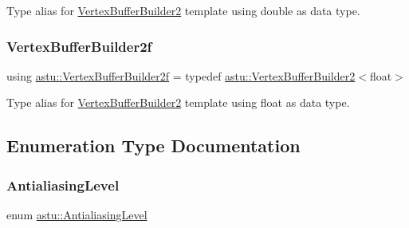 Type alias for \hyperlink{classastu_1_1VertexBufferBuilder2}{Vertex\+Buffer\+Builder2} template using double as data type. \mbox{\label{group__gfx__group_ga45033e159deced790d4dc3968ad8e878}} 
\subsubsection{\texorpdfstring{Vertex\+Buffer\+Builder2f}{VertexBufferBuilder2f}}
{\footnotesize\ttfamily using \hyperlink{group__gfx__group_ga45033e159deced790d4dc3968ad8e878}{astu\+::\+Vertex\+Buffer\+Builder2f} = typedef \hyperlink{classastu_1_1VertexBufferBuilder2}{astu\+::\+Vertex\+Buffer\+Builder2}$<$float$>$}

Type alias for \hyperlink{classastu_1_1VertexBufferBuilder2}{Vertex\+Buffer\+Builder2} template using float as data type. 

\subsection{Enumeration Type Documentation}
\mbox{\label{group__gfx__group_ga7bcac32f8bae9bfd1f21655d4734efe8}} 
\subsubsection{\texorpdfstring{Antialiasing\+Level}{AntialiasingLevel}}
{\footnotesize\ttfamily enum \hyperlink{group__gfx__group_ga7bcac32f8bae9bfd1f21655d4734efe8}{astu\+::\+Antialiasing\+Level}\hspace{0.3cm}{\ttfamily [strong]}}

